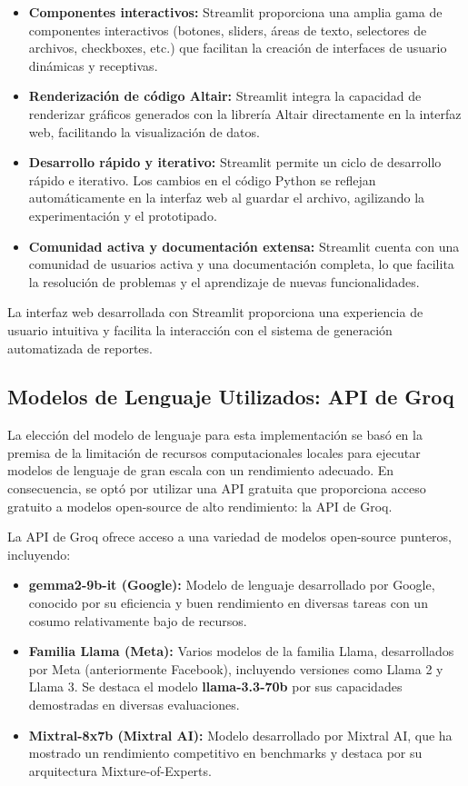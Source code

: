 \begin{itemize}
	\item \textbf{Componentes interactivos:}  Streamlit proporciona una amplia gama de componentes interactivos (botones, sliders, áreas de texto, selectores de archivos, checkboxes, etc.) que facilitan la creación de interfaces de usuario dinámicas y receptivas.
	\item \textbf{Renderización de código Altair:}  Streamlit integra la capacidad de renderizar gráficos generados con la librería Altair directamente en la interfaz web,  facilitando la visualización de datos.
	\item \textbf{Desarrollo rápido y iterativo:}  Streamlit permite un ciclo de desarrollo rápido e iterativo.  Los cambios en el código Python se reflejan automáticamente en la interfaz web al guardar el archivo,  agilizando la experimentación y el prototipado.
	\item \textbf{Comunidad activa y documentación extensa:}  Streamlit cuenta con una comunidad de usuarios activa y una documentación completa,  lo que facilita la resolución de problemas y el aprendizaje de nuevas funcionalidades.
\end{itemize}
La interfaz web desarrollada con Streamlit proporciona una experiencia de usuario intuitiva y facilita la interacción con el sistema de generación automatizada de reportes.

\subsection{Modelos de Lenguaje Utilizados: API de Groq}

La elección del modelo de lenguaje para esta implementación se basó en la premisa de la limitación de recursos computacionales locales para ejecutar modelos de lenguaje de gran escala con un rendimiento adecuado.  En consecuencia,  se optó por utilizar una API gratuita que proporciona acceso gratuito a modelos open-source de alto rendimiento: la API de Groq\cite{groq}.

La API de Groq ofrece acceso a una variedad de modelos open-source punteros,  incluyendo:

\begin{itemize}
	\item \textbf{gemma2-9b-it (Google):}  Modelo de lenguaje desarrollado por Google,  conocido por su eficiencia y buen rendimiento en diversas tareas con un cosumo relativamente bajo de recursos.
	\item \textbf{Familia Llama (Meta):}  Varios modelos de la familia Llama,  desarrollados por Meta (anteriormente Facebook),  incluyendo versiones como Llama 2 y Llama 3.  Se destaca el modelo \textbf{llama-3.3-70b} por sus capacidades demostradas en diversas evaluaciones\cite{llamavsgpt4}.
	\item \textbf{Mixtral-8x7b (Mixtral AI):}  Modelo desarrollado por Mixtral AI,  que ha mostrado un rendimiento competitivo en benchmarks y destaca por su arquitectura Mixture-of-Experts.
\end{itemize}

